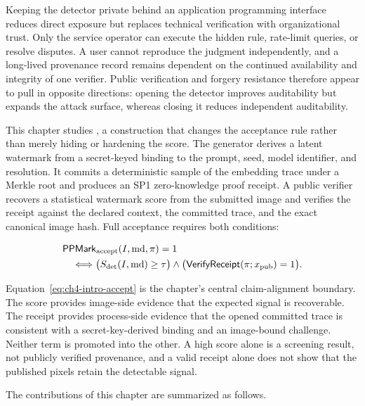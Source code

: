 Keeping the detector private behind an application programming interface reduces
direct exposure but replaces technical verification with organizational trust.
Only the service operator can execute the hidden rule, rate-limit queries, or
resolve disputes.  A user cannot reproduce the judgment independently, and a
long-lived provenance record remains dependent on the continued availability and
integrity of one verifier.  Public verification and forgery resistance therefore
appear to pull in opposite directions: opening the detector improves auditability
but expands the attack surface, whereas closing it reduces independent
auditability.

This chapter studies \PPMark{}, a construction that changes the acceptance rule
rather than merely hiding or hardening the score.  The generator derives a latent
watermark from a secret-keyed binding to the prompt, seed, model identifier, and
resolution.  It commits a deterministic sample of the embedding trace under a
Merkle root and produces an SP1 zero-knowledge proof receipt.  A public verifier
recovers a statistical watermark score from the submitted image and verifies the
receipt against the declared context, the committed trace, and the exact
canonical image hash.  Full acceptance requires both conditions:

\begin{equation}
\begin{aligned}
    &\mathsf{PPMark}_{\mathrm{accept}}(I,\mathrm{md},\pi)=1\\
    &\quad\Longleftrightarrow
    \bigl(S_{\mathrm{det}}(I,\mathrm{md})\geq\tau\bigr)
    \land
    \bigl(\mathsf{VerifyReceipt}(\pi;x_{\mathrm{pub}})=1\bigr).
\end{aligned}
\label{eq:ch4-intro-accept}
\end{equation}

Equation~\eqref{eq:ch4-intro-accept} is the chapter's central claim-alignment
boundary.  The score provides image-side evidence that the expected signal is
recoverable.  The receipt provides process-side evidence that the opened committed
trace is consistent with a secret-key-derived binding and an image-bound challenge.
Neither term is promoted into the other.  A high score alone is a screening
result, not publicly verified provenance, and a valid receipt alone does not show
that the published pixels retain the detectable signal.

The contributions of this chapter are summarized as follows.

